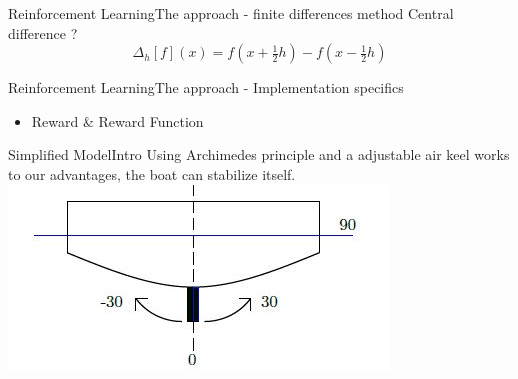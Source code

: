 \documentclass{beamer}
\newtheorem{algorithm}{Algorithm}
\begin{document}
\begin{frame}{Reinforcement Learning}{The approach - finite differences method\vphantom{(y}}
\vspace{-0.7em}
Central difference ?
$$\Delta _{h}[f](x)=f\left(x+{\tfrac {1}{2}}h\right)-f\left(x-{\tfrac {1}{2}}h\right)$$

%
\end{frame}

\begin{frame}{Reinforcement Learning}{The approach - Implementation specifics\vphantom{(y}}
\vspace{-0.7em}
\begin{itemize}
  \item {\color{blue}Reward \& Reward Function}
\end{itemize}
\end{frame}


\begin{frame}{Simplified Model}{Intro\vphantom{(y}}
\vspace{-0.7em}
Using Archimedes principle and a adjustable air keel works to our advantages, the boat can stabilize itself.
\includegraphics{images/boat_keel.JPG}
\end{frame}
\end{document}
